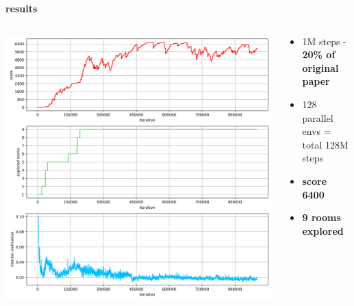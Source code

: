 \documentclass[xcolor=dvipsnames]{beamer}
\begin{document}
\begin{frame}{\bf results}


\begin{columns}

    \begin{column}{0.5\textwidth}
      \includegraphics[scale=0.25]{../results/montezuma_ppo_rnd_a.png}
    \end{column}

    \begin{column}{0.5\textwidth}
      \begin{itemize}
        \item 1M  steps - {\bf 20\% of original paper}
        \item 128 parallel envs = total 128M steps
        \item {\bf score 6400}
        \item {\bf 9 rooms explored}
      \end{itemize}
    \end{column}


  \end{columns}


\end{frame}
\end{document}
